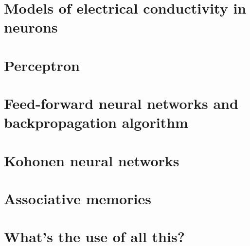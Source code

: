 

\label{chap:nn}
\begin{refsection}


   \section{Models of electrical conductivity in neurons}

   \section{Perceptron}

   \section{Feed-forward neural networks and backpropagation algorithm}

   \section{Kohonen neural networks}

   \section{Associative memories}


   \section{What's the use of all this?}
   


\printbibliography[heading=subbibliography]
\end{refsection}

